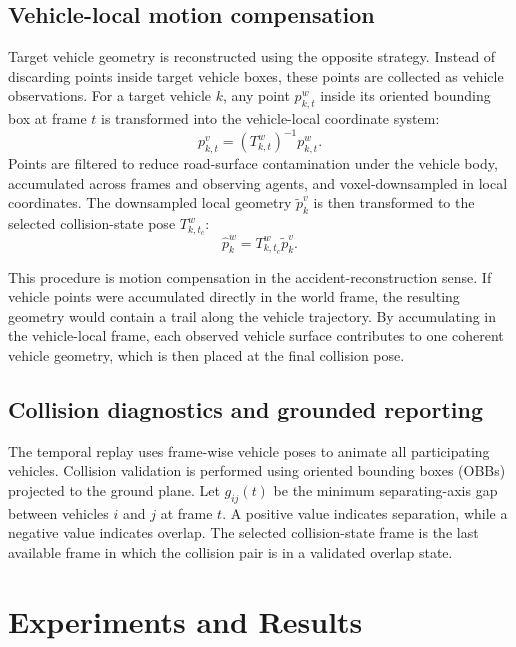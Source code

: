\documentclass[conference]{IEEEtran}
\begin{document}
\subsection{Vehicle-local motion compensation}

Target vehicle geometry is reconstructed using the opposite strategy. Instead
of discarding points inside target vehicle boxes, these points are collected as
vehicle observations. For a target vehicle $k$, any point $p^{w}_{k,t}$ inside
its oriented bounding box at frame $t$ is transformed into the vehicle-local
coordinate system:
\begin{equation}
    p^{v}_{k,t}=\left(T^{w}_{k,t}\right)^{-1}p^{w}_{k,t}.
\end{equation}
Points are filtered to reduce road-surface contamination under the vehicle
body, accumulated across frames and observing agents, and voxel-downsampled in
local coordinates. The downsampled local geometry $\tilde{p}^{v}_{k}$ is then
transformed to the selected collision-state pose $T^{w}_{k,t_c}$:
\begin{equation}
    \hat{p}^{w}_{k}=T^{w}_{k,t_c}\tilde{p}^{v}_{k}.
\end{equation}

This procedure is motion compensation in the accident-reconstruction sense. If
vehicle points were accumulated directly in the world frame, the resulting
geometry would contain a trail along the vehicle trajectory. By accumulating in
the vehicle-local frame, each observed vehicle surface contributes to one
coherent vehicle geometry, which is then placed at the final collision pose.

\subsection{Collision diagnostics and grounded reporting}

The temporal replay uses frame-wise vehicle poses to animate all participating
vehicles. Collision validation is performed using oriented bounding boxes
(OBBs) projected to the ground plane. Let $g_{ij}(t)$ be the minimum
separating-axis gap between vehicles $i$ and $j$ at frame $t$. A positive value
indicates separation, while a negative value indicates overlap. The selected
collision-state frame is the last available frame in which the collision pair
is in a validated overlap state.

\section{Experiments and Results}
\end{document}
